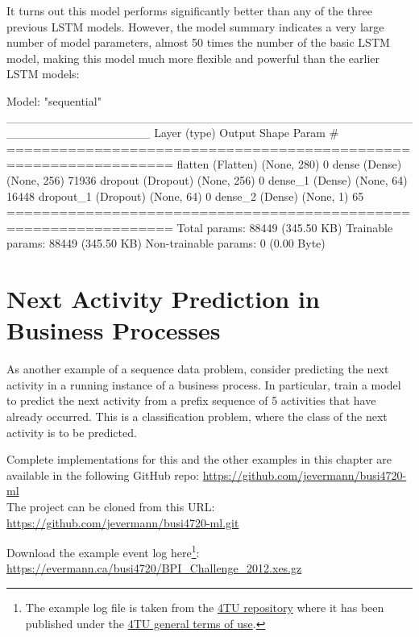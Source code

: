 It turns out this model performs significantly better than any of the three previous LSTM models. However, the model summary indicates a very large number of model parameters, almost 50 times the number of the basic LSTM model, making this model much more flexible and powerful than the earlier LSTM models:

\begin{samepage}
\begin{textcode}
Model: "sequential"
_________________________________________________________________
 Layer (type)                Output Shape              Param #   
=================================================================
 flatten (Flatten)           (None, 280)               0         
 dense (Dense)               (None, 256)               71936     
 dropout (Dropout)           (None, 256)               0         
 dense_1 (Dense)             (None, 64)                16448     
 dropout_1 (Dropout)         (None, 64)                0         
 dense_2 (Dense)             (None, 1)                 65        
=================================================================
Total params: 88449 (345.50 KB)
Trainable params: 88449 (345.50 KB)
Non-trainable params: 0 (0.00 Byte)
\end{textcode}
\end{samepage}

\section{Next Activity Prediction in Business Processes}

As another example of a sequence data problem, consider predicting the next activity in a running instance of a business process. In particular, train a model to predict the next activity from a prefix sequence of 5 activities that have already occurred. This is a classification problem, where the class of the next activity is to be predicted. 

\begin{tcolorbox}[colback=code]
\footnotesize
Complete implementations for this and the other examples in this chapter are available in the following GitHub repo: \url{https://github.com/jevermann/busi4720-ml} \\

The project can be cloned from this URL: \url{https://github.com/jevermann/busi4720-ml.git}

Download the example event log here\footnote{
The example log file is taken from the \href{
https://doi.org/10.4121/uuid:3926db30-f712-4394-aebc-75976070e91f}{4TU repository} where it has been published under the \href{ https://data.4tu.nl/articles/_/12721292/1}{4TU general terms of use}.
}: \url{https://evermann.ca/busi4720/BPI_Challenge_2012.xes.gz}
\normalsize
\end{tcolorbox}

